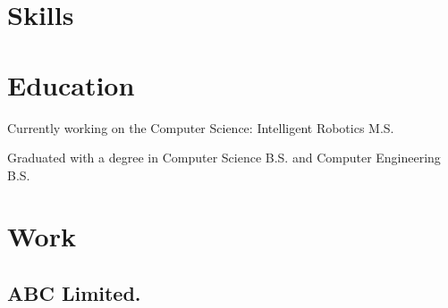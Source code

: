 \documentclass{resume}
\begin{document}

\section{Skills}

\section{Education}
Currently working on the Computer Science: Intelligent Robotics M.S.

Graduated with a degree in Computer Science B.S. and Computer Engineering B.S.

\section{Work}
\subsection{ABC Limited.}
\end{document}
